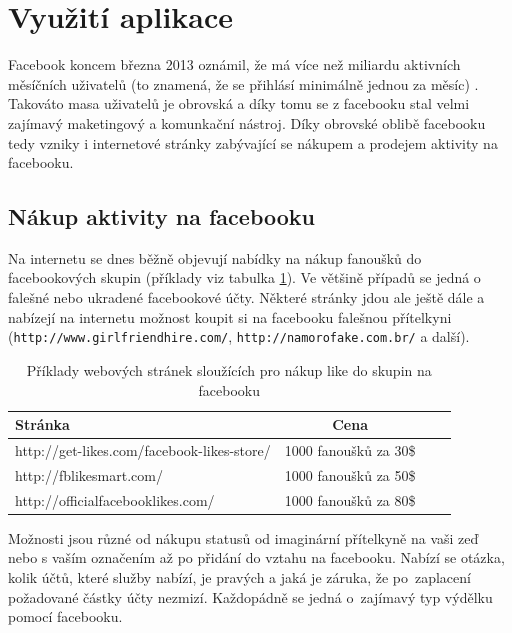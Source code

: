 \documentclass[thesis=M,czech]{FITthesis}[2013/05/10]
\begin{document}
\section{Využití aplikace}

Facebook koncem března 2013 oznámil, že má více než miliardu  aktivních měsíčních uživatelů (to znamená, že se přihlásí minimálně jednou za měsíc) \cite{web:fbMonthlyActiveUsers}. Takováto masa uživatelů je obrovská a díky tomu se z facebooku stal velmi zajímavý maketingový a komunkační nástroj. Díky obrovské oblibě facebooku tedy vzniky i internetové stránky zabývající se nákupem a prodejem aktivity na facebooku.

\subsection{Nákup aktivity na facebooku}

Na internetu se dnes běžně objevují nabídky na nákup fanoušků do facebookových skupin (příklady viz tabulka \ref{tab:likesBuy}). Ve většině případů se jedná o falešné nebo ukradené facebookové účty. Některé stránky jdou ale ještě dále a nabízejí na internetu možnost koupit si na facebooku falešnou přítelkyni (\verb|http://www.girlfriendhire.com/|, \verb|http://namorofake.com.br/| a další). 

\begin{table}[h]
\centering
\caption{Příklady webových stránek sloužících pro nákup like do skupin na facebooku}\label{tab:likesBuy}
\begin{tabular}{| l | c | p{5cm} | c |}
	\hline
	\textbf{Stránka} & 
	\textbf{Cena} \\ \hline
	
	http://get-likes.com/facebook-likes-store/ &
	1000 fanoušků za 30\$ \\ \hline
	
	http://fblikesmart.com/ &
	1000 fanoušků za 50\$ \\ \hline
	
	http://officialfacebooklikes.com/ &
	1000 fanoušků za 80\$ \\ \hline
\end{tabular}
\end{table}

Možnosti jsou různé od nákupu statusů od imaginární přítelkyně na vaši zeď nebo s vaším označením až po přidání do vztahu na facebooku. Nabízí se otázka, kolik účtů, které služby nabízí, je pravých a jaká je záruka, že po~zaplacení požadované částky  účty nezmizí. Každopádně se jedná o~zajímavý typ výdělku pomocí facebooku.
\end{document}

